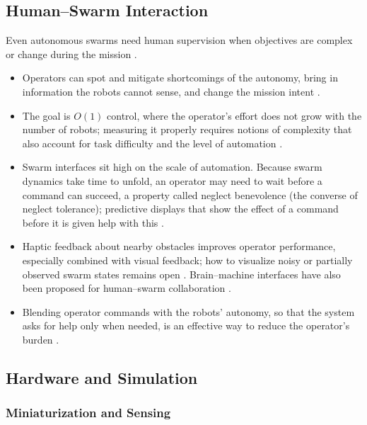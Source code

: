 \subsection{Human--Swarm Interaction}

Even autonomous swarms need human supervision when objectives are complex or
change during the mission \cite{kolling2016human}.
\begin{itemize}
  \item {} Operators can spot and mitigate
        shortcomings of the autonomy, bring in information the robots cannot
        sense, and change the mission intent \cite{kolling2016human}.
  \item {} The goal is $O(1)$ control, where the
        operator's effort does not grow with the number of robots; measuring it
        properly requires notions of complexity that also account for task
        difficulty and the level of automation
        \cite{kolling2016human,hart2004reducing}.
  \item {} Swarm interfaces sit
        high on the scale of automation. Because swarm dynamics take time to
        unfold, an operator may need to wait before a command can succeed, a
        property called neglect benevolence (the converse of neglect tolerance);
        predictive displays that show the effect of a command before it is given
        help with this \cite{kolling2016human}.
  \item {} Haptic feedback about nearby obstacles improves operator
        performance, especially combined with visual feedback; how to visualize
        noisy or partially observed swarm states remains open
        \cite{kolling2016human}. Brain--machine interfaces have also been
        proposed for human--swarm collaboration \cite{bhowmick2024bio}.
  \item {} Blending operator commands with the robots'
        autonomy, so that the system asks for help only when needed, is an
        effective way to reduce the operator's burden \cite{kolling2016human}.
\end{itemize}

\subsection{Hardware and Simulation}

\subsubsection{Miniaturization and Sensing}

